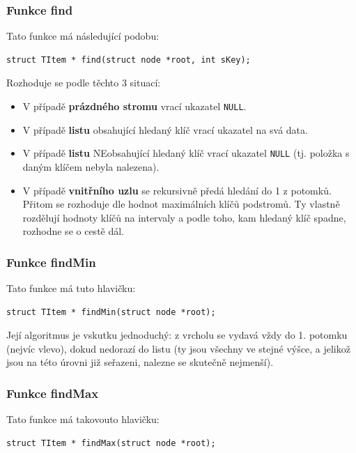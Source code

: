\documentclass[11pt,a4paper]{article}
\begin{document}
\subsubsection{Funkce find}

Tato funkce má následující podobu:

\begin{verbatim}
struct TItem * find(struct node *root, int sKey);
\end{verbatim}

Rozhoduje se podle těchto 3 situací:

\renewcommand{\labelitemi}{$\nabla$}

\begin{itemize}
\item V případě \textbf{prázdného stromu} vrací ukazatel \verb~NULL~.
\item V případě \textbf{listu} obsahující hledaný klíč vrací ukazatel na svá data.
\item V případě \textbf{listu} NEobsahující hledaný klíč vrací ukazatel
\verb~NULL~ (tj. položka s daným klíčem nebyla nalezena).
\item V případě \textbf{vnitřního uzlu} se rekursivně předá hledání do 1 z potomků.
Přitom se rozhoduje dle hodnot maximálních klíčů podstromů.
Ty vlastně rozdělují hodnoty klíčů na intervaly a podle toho, kam hledaný klíč
spadne, rozhodne se o cestě dál.
\end{itemize}

\subsubsection{Funkce findMin}

Tato funkce má tuto hlavičku:

\begin{verbatim}
struct TItem * findMin(struct node *root);
\end{verbatim}

Její algoritmus je vskutku jednoduchý: z vrcholu se vydavá vždy do 1. potomku
(nejvíc vlevo), dokud nedorazí do listu (ty jsou všechny ve stejné výšce, a
jelikož jsou na této úrovni již seřazeni, nalezne se skutečně nejmenší).

\subsubsection{Funkce findMax}

Tato funkce má takovouto hlavičku:

\begin{verbatim}
struct TItem * findMax(struct node *root);
\end{verbatim}
\end{document}

